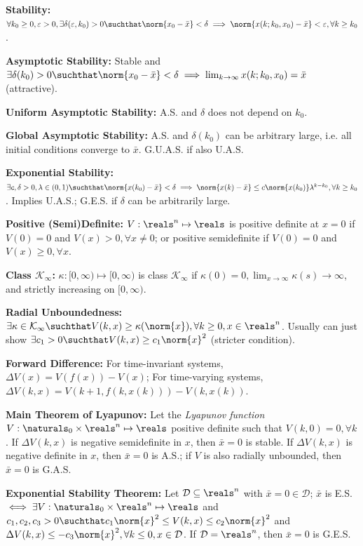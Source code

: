 \documentclass[twocolumn, 8pt]{extarticle}
\begin{document}
\textbf{Stability:} $\forall k_0 \geq 0, \varepsilon > 0, \exists \delta(\varepsilon, k_0) > 0 \suchthat \norm{x_0 - \bar x} < \delta \implies \norm{x(k; k_0, x_0) - \bar x} < \varepsilon, \forall k \geq k_0$.

\textbf{Asymptotic Stability:} Stable and $\exists \delta(k_0) > 0 \suchthat \norm{x_0 - \bar x} < \delta \implies \lim _{k \to \infty} x(k; k_0, x_0) = \bar x$ (attractive).

\textbf{Uniform Asymptotic Stability:} A.S. and \(\delta\) does not depend on \(k_0\).

\textbf{Global Asymptotic Stability:} A.S. and \(\delta(k_0)\) can be arbitrary large, i.e. all initial
conditions converge to \(\bar x\). G.U.A.S. if also U.A.S.

\textbf{Exponential Stability:} \(\exists c, \delta > 0, \lambda \in (0, 1) \suchthat \norm{x(k_0) - \bar x} < \delta \implies \norm{x(k) - \bar x} \leq c\norm{x(k_0)}\lambda^{k - k_0}, \forall k \geq k_0\).
Implies U.A.S.; G.E.S. if \(\delta\) can be arbitrarily large.

\textbf{Positive (Semi)Definite:} $V: \reals^n \mapsto \reals$ is positive definite at $x = 0$ if $V(0) = 0$ and $V(x) > 0, \forall x \neq 0$;
or positive semidefinite if $V(0) = 0$ and $V(x) \geq 0, \forall x$.

\textbf{Class \(\mathcal K_\infty\):} \(\kappa: [0, \infty) \mapsto [0, \infty)\) is class
\(\mathcal K_\infty\) if \(\displaystyle \kappa(0) = 0, \lim _{x \to \infty} \kappa(s) \to \infty\), and strictly increasing on $[0, \infty)$.

\textbf{Radial Unboundedness:} \(\exists \kappa \in \mathcal K_\infty \suchthat V(k, x) \geq \kappa(\norm{x}), \forall k \geq 0, x \in \reals^n\).
Usually can just show \(\exists c_1 > 0 \suchthat V(k, x) \geq c_1\norm{x}^2\) (stricter condition).

\textbf{Forward Difference:} For time-invariant systems, $\Delta V(x) = V(f(x)) - V(x)$;
For time-varying systems, $\Delta V(k, x) = V(k + 1, f(k, x(k))) - V(k, x(k))$.

\textbf{Main Theorem of Lyapunov:} Let the \textit{Lyapunov function} $V: \naturals _0 \times \reals^n \mapsto \reals$
positive definite such that $V(k, 0) = 0, \forall k$. If $\Delta V(k, x)$ is negative semidefinite in $x$, then $\bar x
= 0$ is stable. If $\Delta V(k, x)$ is negative definite in $x$, then $\bar x = 0$ is A.S.; if $V$ is also radially
unbounded, then $\bar x = 0$ is G.A.S.

\textbf{Exponential Stability Theorem:} Let $\mathcal D \subseteq \reals^n$ with $\bar x = 0 \in \mathcal D$;
$\bar x$ is E.S. $\iff \exists V: \naturals _0 \times \reals^n \mapsto \reals$ and $c_1, c_2, c_3 > 0 \suchthat c_1\norm{x}^2 \leq V(k, x) \leq c_2\norm{x}^2$ and $\Delta V(k, x) \leq -c_3\norm{x}^2, \forall k \leq 0, x \in \mathcal D$.
If \(\mathcal D = \reals^n\), then \(\bar x = 0\) is G.E.S.
\end{document}
